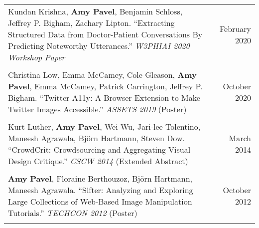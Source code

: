 \begin{longtable}{Xr}
	Kundan Krishna, \textbf{Amy Pavel}, Benjamin Schloss, Jeffrey P. Bigham, Zachary Lipton. ``Extracting Structured Data from Doctor-Patient Conversations By Predicting Noteworthy Utterances.'' \textit{W3PHIAI 2020 Workshop Paper} & February 2020 \\
	\\

	Christina Low, Emma McCamey, Cole Gleason, \textbf{Amy Pavel}, Emma McCamey, Patrick Carrington, Jeffrey P. Bigham. ``Twitter A11y: A Browser Extension to Make Twitter Images Accessible.'' \textit{ASSETS 2019} (Poster) & October 2020 \\
	\\

	Kurt Luther, \textbf{Amy Pavel}, Wei Wu, Jari-lee Tolentino, Maneesh Agrawala, Björn Hartmann, Steven Dow. ``CrowdCrit: Crowdsourcing and Aggregating Visual Design Critique.'' \textit{CSCW 2014} (Extended Abstract) & March 2014 \\
	\\

	\textbf{Amy Pavel}, Floraine Berthouzoz, Björn Hartmann, Maneesh Agrawala. ``Sifter: Analyzing and Exploring Large Collections of Web-Based Image Manipulation Tutorials.'' \textit{TECHCON 2012} (Poster) & October 2012 \\
	\\

\end{longtable}